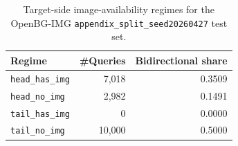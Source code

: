 \begin{table}[t]
\centering
\caption{Target-side image-availability regimes for the OpenBG-IMG \texttt{appendix\_split\_seed20260427} test set.}
\label{tab:target_side_regime_counts_appendix_split_seed20260427}
\small
\begin{tabular}{lrr}
\toprule
Regime & \#Queries & Bidirectional share \\
\midrule
\texttt{head\_has\_img} & 7{,}018 & 0.3509 \\
\texttt{head\_no\_img} & 2{,}982 & 0.1491 \\
\texttt{tail\_has\_img} & 0 & 0.0000 \\
\texttt{tail\_no\_img} & 10{,}000 & 0.5000 \\
\bottomrule
\end{tabular}
\end{table}
